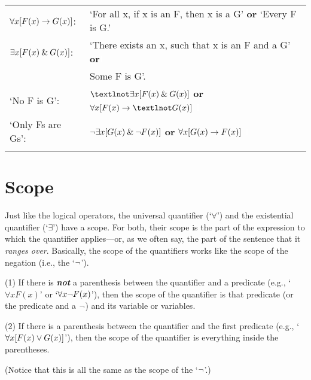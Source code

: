 \begin{table*} %
\centering\sffamily\footnotesize
{}
\begin{tabular}{@{}m{2.3cm}  l@{}}\arrayrulecolor{black}\hline
$\forall x[F(x) \rightarrow G(x)]$:
&`For all x, if x is an F, then x is a G’ \textbf{or} 
`Every F is G.’\\  %

$\exists x[F(x) \mathbin{\&} G(x)]$:
&`There exists an x, such that x is an F and a G’ \textbf{or}\textcolor{white}{\LARGE{I}}\\ 
&Some F is G’.\\   %

`No F is G’:
&$¬\exists x[F(x) \eand G(x)] $ \textbf{or} $\forall x[F(x) \eif ¬G(x)]$ \textcolor{white}{\LARGE{I}}\\  %

‘Only Fs are Gs’:
&${\neg} \exists x[G(x) \mathbin{\&} {\neg} F(x)]$ \textbf{or} $\forall x[G(x) \rightarrow F(x)]$ \textcolor{white}{\LARGE{I}}\\\arrayrulecolor{black}\hline
\end{tabular}
\caption{}\label{FOL-translations}
\end{table*}


\section{Scope}

Just like the logical operators, the universal quantifier (`$\forall$’) and the existential quantifier (`$\exists$’) have a scope. For both, their scope is the part of the expression to which the quantifier applies---or, as we often say, the part of the sentence that it \textit{ranges over}. Basically, the scope of the quantifiers works like the scope of the negation (i.e., the `${\neg}$’). 

\begin{ebullet}
\item[(1)] If there is \textit\textbf{not} a parenthesis between the quantifier and a predicate (e.g., `$\forall xF(x)$’ or `$\forall x {\neg} F(x)$’), then the scope of the quantifier is that predicate (or the predicate and a ${\neg}$) and its variable or variables.\smallskip
\item[(2)] If there is a parenthesis between the quantifier and the first predicate (e.g., `$\forall x[F(x) \vee G(x)]$’), then the scope of the quantifier is everything inside the parentheses.\smallskip
\item[] (Notice that this is all the same as the scope of the `${\neg}$’.)
\end{ebullet}
